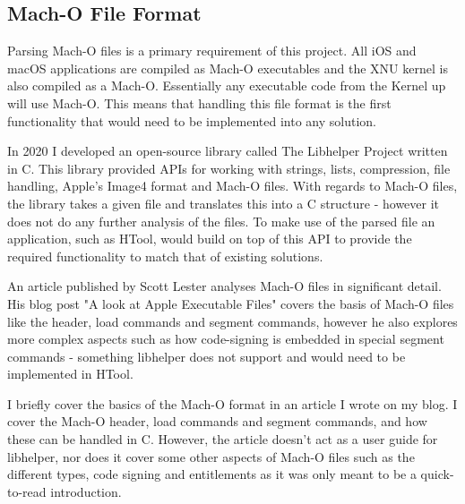 \subsection{Mach-O File Format}


Parsing Mach-O files is a primary requirement of this project. All iOS and macOS applications are compiled as Mach-O executables and the XNU kernel is also compiled as a Mach-O. Essentially any executable code from the Kernel up will use Mach-O. This means that handling this file format is the first functionality that would need to be implemented into any solution.




In 2020 I developed an open-source library called The Libhelper Project\cite{github-libhelper} written in C. This library provided APIs for working with strings, lists, compression, file handling, Apple's Image4 format and Mach-O files. With regards to Mach-O files, the library takes a given file and translates this into a C structure - however it does not do any further analysis of the files. To make use of the parsed file an application, such as HTool, would build on top of this API to provide the required functionality to match that of existing solutions.


An article published by Scott Lester analyses Mach-O files in significant detail. His blog post "A look at Apple Executable Files"\cite{lester-macho} covers the basis of Mach-O files like the header, load commands and segment commands, however he also explores more complex aspects such as how code-signing is embedded in special segment commands - something libhelper does not support and would need to be implemented in HTool.


I briefly cover the basics of the Mach-O format in an article I wrote on my blog\cite{moulton-macho}. I cover the Mach-O header, load commands and segment commands, and how these can be handled in C. However, the article doesn't act as a user guide for libhelper, nor does it cover some other aspects of Mach-O files such as the different types, code signing and entitlements as it was only meant to be a quick-to-read introduction.



